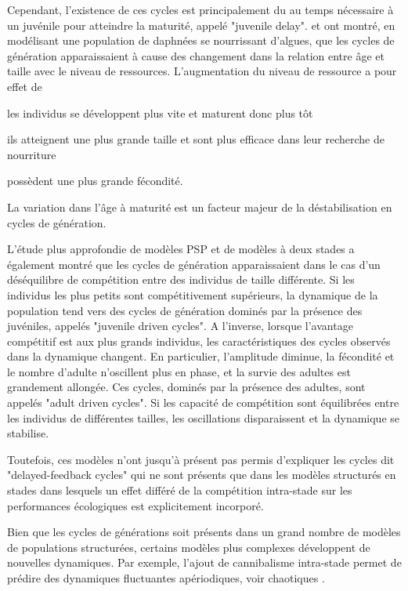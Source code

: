 Cependant, l'existence de ces cycles est principalement du au temps nécessaire à
un juvénile pour atteindre la maturité, appelé "juvenile delay".
\textcite{de-roos1990a} et \textcite{de-roos1997a} ont montré, en modélisant
une population de daphnées se nourrissant d'algues, que les cycles de génération apparaissaient à
cause des changement dans la relation entre âge et taille avec le niveau de
ressources. L'augmentation du niveau de ressource a pour effet de
\begin{enumerate*}[label=(\roman*), before=\unskip{ : }, itemjoin={{ ; }},
itemjoin*={{ ; et }}]\item les individus se développent plus vite et maturent
donc plus tôt \item ils atteignent une plus grande taille et sont plus efficace
dans leur recherche de nourriture \item possèdent une plus grande
fécondité.\end{enumerate*} La variation dans l'âge à maturité est un facteur
majeur de la déstabilisation en cycles de génération.

L'étude plus approfondie de modèles PSP et de modèles à deux stades
\autocite[juvéniles et adultes, ][]{de-roos2003a} a également montré que les
cycles de génération apparaissaient dans le cas d'un déséquilibre de compétition
entre des individus de taille différente. Si les individus les plus petits sont
compétitivement supérieurs, la dynamique de la population tend vers des cycles
de génération dominés par la présence des juvéniles, appelés "juvenile driven
cycles". A l'inverse, lorsque l'avantage compétitif est aux plus grands
individus, les caractéristiques des cycles observés dans la dynamique changent.
En particulier, l'amplitude diminue, la fécondité et le nombre d'adulte
n'oscillent plus en phase, et la survie des adultes est grandement allongée. Ces
cycles, dominés par la présence des adultes, sont appelés "adult driven cycles".
Si les capacité de compétition sont équilibrées entre les individus de
différentes tailles, les oscillations disparaissent et la dynamique se
stabilise. 

Toutefois, ces modèles n'ont jusqu'à présent pas permis d'expliquer
les cycles dit "delayed-feedback cycles" qui ne sont présents que dans les
modèles structurés en stades dans lesquels un effet différé de la compétition
intra-stade sur les performances écologiques est explicitement incorporé.

Bien que les cycles de générations soit présents dans un grand nombre de modèles
de populations structurées, certains modèles plus complexes développent de
nouvelles dynamiques. Par exemple, l'ajout de cannibalisme intra-stade permet de
prédire des dynamiques fluctuantes apériodiques, voir chaotiques
\autocite{costantino1997a,dennis1997a}.

